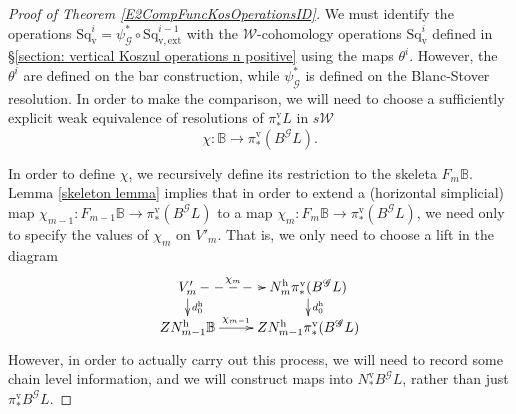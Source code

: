 \documentclass[11pt]{amsart} \renewcommand{\baselinestretch}{1.2}
\theoremstyle{plain}
\numberwithin{equation}{section} %
\theoremstyle{plain}
\numberwithin{equation}{chapter} %
\DeclareMathOperator{\im}{im}
\renewcommand{\to}{\longrightarrow}
\newcommand{\scrG}{\mathscr{G}}
\newcommand{\calw}{\mathcal{W}}
\newcommand{\citeBOX}[2][]{\cite[\mbox{#1}]{#2}}
\newcommand{\BSW}{{\scrG}}
\newcommand{\BSWres}{B^\BSW}%
\newcommand{\vExtCohOp}{\mathrm{Sq}_\mathrm{v,ext}}
\newcommand{\Id}{\mathrm{id}}
\newcommand{\uver}{^\mathrm{v}}
\newcommand{\uhor}{^\mathrm{h}}
\newcommand{\dver}{_\mathrm{v}}
\newcommand{\Sqv}{\mathrm{Sq}\dver}
\begin{document}
\begin{Operations in composite functor spectral sequences}
\begin{proof}[Proof of Theorem \ref{E2CompFuncKosOperationsID}]
We must identify the operations $\Sqv^i=\psi_\BSW^*\circ\vExtCohOp^{i-1}$ with the $\calw$-cohomology operations $\Sqv^i$ defined in \S\ref{section: vertical Koszul operations n positive} using the maps $\theta^i$. However, the $\theta^i$ are defined on the bar construction, while $\psi_\BSW^*$ is defined on the Blanc-Stover resolution. In order to make the comparison, we will need to choose a sufficiently explicit weak equivalence of resolutions of $\pi\uver_* L$ in $s\calw$
\[\chi:\mathbb{B}\to \pi\uver_*(\BSWres L).\]




In order to define $\chi$, we recursively define its restriction to the skeleta $F_m\mathbb{B}$. Lemma \ref{skeleton lemma} implies that in order to extend a (horizontal simplicial) map $\chi_{m-1}:F_{m-1}\mathbb{B}\to \pi\uver_*(\BSWres L)$ to a map $\chi_m:F_m\mathbb{B}\to \pi\uver_*(\BSWres L)$, we need only to specify the values of $\chi_m$ on $V'_m$. That is, we only need to choose a lift in the diagram
\[\xymatrix@R=4mm{
V'_m\ar@{-->}[r]^-{\chi_m}
\ar[d]^-{d\uhor_0}
&%
N\uhor_m\pi\uver_*(\BSWres L)\ar[d]^-{d\uhor_0}
\\%
ZN\uhor_{m-1}\mathbb{B}\ar[r]^-{\chi_{m-1}}
&%
ZN\uhor_{m-1}\pi\uver_*(\BSWres L)%
}\]
However, in order to actually carry out this process, we will need to record some chain level information, and we will  construct maps into $N\uver_*B^{\BSW}L$, rather than just $\pi\uver_*B^{\BSW}L$. 


\end{proof}
\end{Operations in composite functor spectral sequences}
\end{document}

